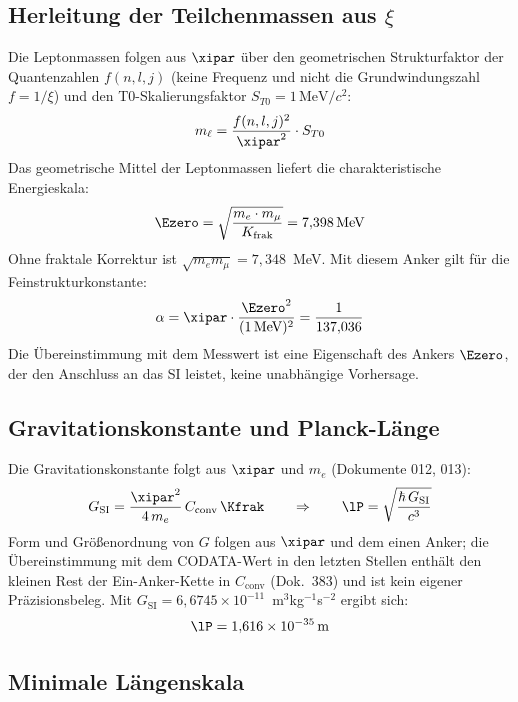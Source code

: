 \subsection{Herleitung der Teilchenmassen aus \texorpdfstring{$\xi$}{xi}}

Die Leptonmassen folgen aus $\xipar$ über den geometrischen Strukturfaktor der Quantenzahlen $f(n,l,j)$ (keine Frequenz und nicht die Grundwindungszahl $f = 1/\xi$) und den T0-Skalierungsfaktor $S_{T0} = 1\,\text{MeV}/c^2$:
\begin{equation}
	m_\ell = \frac{f(n,l,j)^2}{\xipar^2} \cdot S_{T0}
\end{equation}
Das geometrische Mittel der Leptonmassen liefert die charakteristische Energieskala:
\begin{equation}
	\Ezero = \sqrt{\frac{m_e \cdot m_\mu}{K_{\text{frak}}}} = 7{,}398\,\text{MeV}
\end{equation}
Ohne fraktale Korrektur ist $\sqrt{m_e m_\mu} = 7{,}348$~MeV. Mit diesem Anker gilt für die Feinstrukturkonstante:
\begin{equation}
	\alpha = \xipar \cdot \frac{\Ezero^2}{(1\,\text{MeV})^2} = \frac{1}{137{,}036}
\end{equation}
Die Übereinstimmung mit dem Messwert ist eine Eigenschaft des Ankers $\Ezero$, der den Anschluss an das SI leistet, keine unabhängige Vorhersage.

\subsection{Gravitationskonstante und Planck-Länge}

Die Gravitationskonstante folgt aus $\xipar$ und $m_e$ (Dokumente 012, 013):
\begin{equation}
	G_{\text{SI}} = \frac{\xipar^2}{4\,m_e}\,C_{\text{conv}}\,\Kfrak \qquad\Rightarrow\qquad \lP = \sqrt{\frac{\hbar\,G_{\text{SI}}}{c^3}}
\end{equation}
Form und Größenordnung von $G$ folgen aus $\xipar$ und dem einen Anker; die Übereinstimmung mit dem CODATA-Wert in den letzten Stellen enthält den kleinen Rest der Ein-Anker-Kette in $C_{\text{conv}}$ (Dok.~383) und ist kein eigener Präzisionsbeleg. Mit $G_{\text{SI}} = 6{,}6745\times10^{-11}$~m$^3$kg$^{-1}$s$^{-2}$ ergibt sich:
\begin{equation}
	\lP = 1{,}616 \times 10^{-35}\,\text{m}
\end{equation}

\subsection{Minimale Längenskala}

